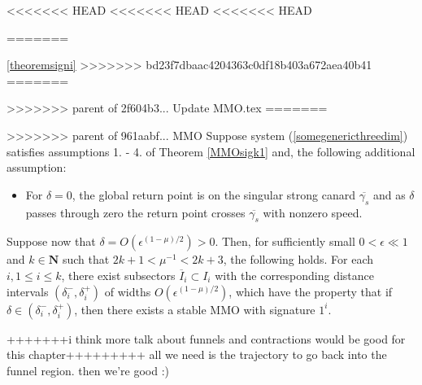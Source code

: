 <<<<<<< HEAD
<<<<<<< HEAD
<<<<<<< HEAD
\begin{theorem}
=======
\begin{theorem} \ref{theoremsigni}
>>>>>>> bd23f7dbaac4204363c0df18b403a672aea40b41
=======
\begin{theorem}
>>>>>>> parent of 2f604b3... Update MMO.tex
=======
\begin{theorem}
>>>>>>> parent of 961aabf... MMO
Suppose system (\ref{somegenericthreedim}) satisfies assumptions 1. - 4. of Theorem \ref{MMOsigk1} and, the following additional assumption:
\begin{itemize}
\item For $\delta = 0$, the global return point is on the singular strong canard $\overline{\gamma_s}$ and as $\delta$ passes through zero the return point crosses $\overline{\gamma_s}$ with nonzero speed.
\end{itemize}
Suppose now that $\delta= O(\epsilon ^{(1-\mu)/2})>0$. Then, for sufficiently small $0 < \epsilon \ll 1$ and $k \in \mathbf{N}$ such that $2k+1 < \mu^{-1} < 2k+ 3$, the following holds.
For each $i, 1 \leq i \leq k$, there exist subsectors $\overline{I}_i \subset I_i$ with the corresponding distance intervals $(\delta_i^-, \delta_i^+)$ of widths $O(\epsilon^{(1-\mu)/2})$, which have the property that if $\delta \in (\delta_i^-, \delta_i^+)$, then there exists a stable MMO with signature $1^i$.
\end{theorem}

+++++++i think more talk about funnels and contractions would be good for this chapter+++++++++
all we need is the trajectory to go back into the funnel region. then we're good :)



















































\end{theorem}
\end{theorem}
\end{theorem}

